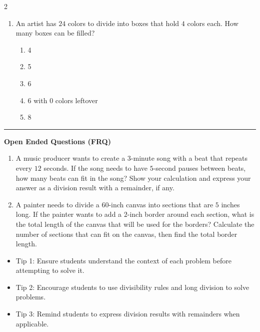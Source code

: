 \documentclass[10pt]{article}
\begin{document}
\begin{multicols}{2}
\begin{enumerate}[label=\textbf{Q\arabic*.}, leftmargin=*, itemsep=6pt, parsep=0pt]
  \item \small An artist has $24$ colors to divide into boxes that hold $4$ colors each. How many boxes can be filled?
  \begin{enumerate}[label=(\Alph*), leftmargin=0.6cm, nosep, itemsep=2pt]
    \item 4
    \item 5
    \item 6
    \item 6 with 0 colors leftover
    \item 8
  \end{enumerate}

\end{enumerate}
\end{multicols}

\vspace{-0.2cm}
\hrule
\vspace{0.2cm}
\textbf{\small Open Ended Questions (FRQ)}
\begin{enumerate}[label=\textbf{Q\arabic*.}, start=9, itemsep=5pt, topsep=0pt]

  \item \small A music producer wants to create a $3$-minute song with a beat that repeats every $12$ seconds. If the song needs to have $5$-second pauses between beats, how many beats can fit in the song? Show your calculation and express your answer as a division result with a remainder, if any. \vspace{2cm}

  \item \small A painter needs to divide a $60$-inch canvas into sections that are $5$ inches long. If the painter wants to add a $2$-inch border around each section, what is the total length of the canvas that will be used for the borders? Calculate the number of sections that can fit on the canvas, then find the total border length. \vspace{2cm}

\end{enumerate}

\vfill

\begin{tcolorbox}[colback=blue!5, colframe=mainblue!50, title=\small \textbf{Chef's Tips}, fonttitle=\bfseries, bottom=1mm]
\begin{itemize}[noitemsep, topsep=2pt, leftmargin=0.5cm]
  \item \scriptsize Tip 1: Ensure students understand the context of each problem before attempting to solve it.\item \scriptsize Tip 2: Encourage students to use divisibility rules and long division to solve problems.\item \scriptsize Tip 3: Remind students to express division results with remainders when applicable.
\end{itemize}
\end{tcolorbox}
\end{document}
